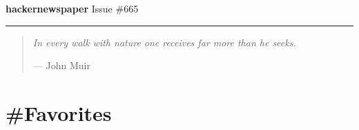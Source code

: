 \documentclass[10pt,a4paper]{article}
\begin{document}
\thispagestyle{empty}
\Huge {} 
\noindent\textbf{hacker{\color{red}news}paper}
\normalfont
\normalsize
\hfill Issue \#665

{\noindent\color{red} \rule{\linewidth}{0.5mm}}

\begin{quotation}
    \textit{
In every walk with nature one receives far more than he seeks. } \par\hfill --- John Muir

 
\end{quotation}

\tableofcontents

\newpage
\pagestyle{fancy}

\section{\#Favorites}
\end{document}
